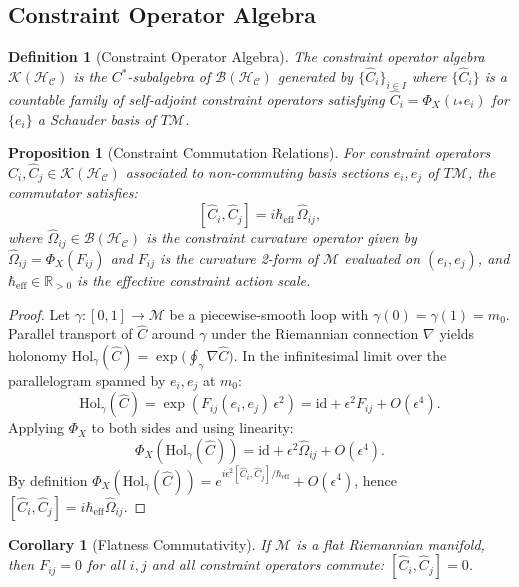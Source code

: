 \documentclass[twocolumn,aps,prd,superscriptaddress,nofootinbib]{revtex4-2}
\newtheorem{corollary}[theorem]{Corollary}
\newtheorem{proposition}[theorem]{Proposition}
\newtheorem{definition}{Definition}[section]
\newcommand{\HC}{\mathcal{H}_{\mathcal{C}}}
\newcommand{\CM}{\mathcal{M}}
\newcommand{\CK}{\mathcal{K}}
\newcommand{\CB}{\mathcal{B}}
\newcommand{\hatC}{\hat{C}}
\newcommand{\id}{\mathrm{id}}
\begin{document}
\subsection{Constraint Operator Algebra}

\begin{definition}[Constraint Operator Algebra]
\label{def:calg}
The \emph{constraint operator algebra} $\CK(\HC)$ is the $C^*$-subalgebra of
$\CB(\HC)$ generated by $\{\hatC_i\}_{i \in I}$ where $\{\hatC_i\}$ is a
countable family of self-adjoint constraint operators satisfying
$\hatC_i = \Phi_X(\iota_* e_i)$ for $\{e_i\}$ a Schauder basis of $T\CM$.
\end{definition}

\begin{proposition}[Constraint Commutation Relations]
\label{prop:commutation}
For constraint operators $\hatC_i, \hatC_j \in \CK(\HC)$ associated to
non-commuting basis sections $e_i, e_j$ of $T\CM$, the commutator satisfies:
\[
  [\hatC_i, \hatC_j] = i\hbar_{\mathrm{eff}}\,\hat{\Omega}_{ij},
\]
where $\hat{\Omega}_{ij} \in \CB(\HC)$ is the \emph{constraint curvature
operator} given by $\hat{\Omega}_{ij} = \Phi_X(F_{ij})$ and $F_{ij}$ is the
curvature 2-form of $\CM$ evaluated on $(e_i, e_j)$, and
$\hbar_{\mathrm{eff}} \in \mathbb{R}_{>0}$ is the effective constraint
action scale.
\end{proposition}

\begin{proof}
Let $\gamma : [0,1] \to \CM$ be a piecewise-smooth loop with $\gamma(0) = \gamma(1) = m_0$.  Parallel transport of $\hatC$ around $\gamma$ under the Riemannian connection $\nabla$ yields holonomy
$\mathrm{Hol}_\gamma(\hatC) = \exp\!\bigl(\oint_\gamma \nabla\hatC\bigr)$.
In the infinitesimal limit over the parallelogram spanned by $e_i, e_j$ at $m_0$:
\[
  \mathrm{Hol}_\gamma(\hatC) = \exp(F_{ij}(e_i, e_j)\,\epsilon^2) = \id + \epsilon^2 F_{ij} + O(\epsilon^4).
\]
Applying $\Phi_X$ to both sides and using linearity:
\[
  \Phi_X(\mathrm{Hol}_\gamma(\hatC)) = \id + \epsilon^2 \hat\Omega_{ij} + O(\epsilon^4).
\]
By definition $\Phi_X(\mathrm{Hol}_\gamma(\hatC)) = e^{i\epsilon^2[\hatC_i,\hatC_j]/\hbar_{\mathrm{eff}}} + O(\epsilon^4)$, hence $[\hatC_i,\hatC_j] = i\hbar_{\mathrm{eff}}\hat\Omega_{ij}$.
\end{proof}

\begin{corollary}[Flatness Commutativity]
\label{cor:flat}
If $\CM$ is a flat Riemannian manifold, then $F_{ij} = 0$ for all $i,j$ and
all constraint operators commute: $[\hatC_i, \hatC_j] = 0$.
\end{corollary}
\end{document}
